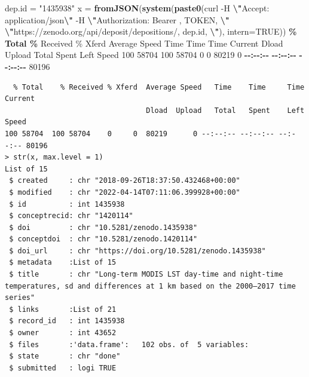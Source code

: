 \documentclass[
  graybox,natbib,nospthms]{svmono}
\newenvironment{Shaded}{\begin{snugshade}}{\end{snugshade}}
\newcommand{\AttributeTok}[1]{\textcolor[rgb]{0.27,0.27,0.27}{#1}}
\newcommand{\ConstantTok}[1]{\textcolor[rgb]{0.37,0.37,0.37}{#1}}
\newcommand{\DecValTok}[1]{\textcolor[rgb]{0.06,0.06,0.06}{#1}}
\newcommand{\ErrorTok}[1]{\textcolor[rgb]{0.14,0.14,0.14}{\textbf{#1}}}
\newcommand{\FunctionTok}[1]{\textcolor[rgb]{0.27,0.27,0.27}{\textbf{#1}}}
\newcommand{\NormalTok}[1]{#1}
\newcommand{\OtherTok}[1]{\textcolor[rgb]{0.37,0.37,0.37}{#1}}
\newcommand{\SpecialCharTok}[1]{\textcolor[rgb]{0.43,0.43,0.43}{\textbf{#1}}}
\newcommand{\StringTok}[1]{\textcolor[rgb]{0.5,0.5,0.5}{#1}}
\begin{document}
\begin{Shaded}
\begin{Highlighting}[]
\NormalTok{dep.id }\OtherTok{=} \StringTok{"1435938"}
\NormalTok{x }\OtherTok{=} \FunctionTok{fromJSON}\NormalTok{(}\FunctionTok{system}\NormalTok{(}\FunctionTok{paste0}\NormalTok{(}\StringTok{\textquotesingle{}curl {-}H }\SpecialCharTok{\textbackslash{}"}\StringTok{Accept: application/json}\SpecialCharTok{\textbackslash{}"}\StringTok{ {-}H }\SpecialCharTok{\textbackslash{}"}\StringTok{Authorization: Bearer \textquotesingle{}}\NormalTok{, }
\NormalTok{        TOKEN, }\StringTok{\textquotesingle{}}\SpecialCharTok{\textbackslash{}"}\StringTok{ }\SpecialCharTok{\textbackslash{}"}\StringTok{https://zenodo.org/api/deposit/depositions/\textquotesingle{}}\NormalTok{, dep.id, }\StringTok{\textquotesingle{}}\SpecialCharTok{\textbackslash{}"}\StringTok{\textquotesingle{}}\NormalTok{), }\AttributeTok{intern=}\ConstantTok{TRUE}\NormalTok{))}
  \SpecialCharTok{\% Total    \%}\NormalTok{ Received \% Xferd  Average Speed   Time    Time     Time  Current}
\NormalTok{                                 Dload  Upload   Total   Spent    Left  Speed}
\DecValTok{100} \DecValTok{58704}  \DecValTok{100} \DecValTok{58704}    \DecValTok{0}     \DecValTok{0}  \DecValTok{80219}      \DecValTok{0} \SpecialCharTok{{-}{-}}\ErrorTok{:}\SpecialCharTok{{-}{-}}\ErrorTok{:}\SpecialCharTok{{-}{-}} \SpecialCharTok{{-}{-}}\ErrorTok{:}\SpecialCharTok{{-}{-}}\ErrorTok{:}\SpecialCharTok{{-}{-}} \SpecialCharTok{{-}{-}}\ErrorTok{:}\SpecialCharTok{{-}{-}}\ErrorTok{:}\SpecialCharTok{{-}{-}} \DecValTok{80196}
\end{Highlighting}
\end{Shaded}

\begin{verbatim}
  % Total    % Received % Xferd  Average Speed   Time    Time     Time  Current
                                 Dload  Upload   Total   Spent    Left  Speed
100 58704  100 58704    0     0  80219      0 --:--:-- --:--:-- --:--:-- 80196
> str(x, max.level = 1)
List of 15
 $ created     : chr "2018-09-26T18:37:50.432468+00:00"
 $ modified    : chr "2022-04-14T07:11:06.399928+00:00"
 $ id          : int 1435938
 $ conceptrecid: chr "1420114"
 $ doi         : chr "10.5281/zenodo.1435938"
 $ conceptdoi  : chr "10.5281/zenodo.1420114"
 $ doi_url     : chr "https://doi.org/10.5281/zenodo.1435938"
 $ metadata    :List of 15
 $ title       : chr "Long-term MODIS LST day-time and night-time temperatures, sd and differences at 1 km based on the 2000–2017 time series"
 $ links       :List of 21
 $ record_id   : int 1435938
 $ owner       : int 43652
 $ files       :'data.frame':   102 obs. of  5 variables:
 $ state       : chr "done"
 $ submitted   : logi TRUE
\end{verbatim}
\end{document}
